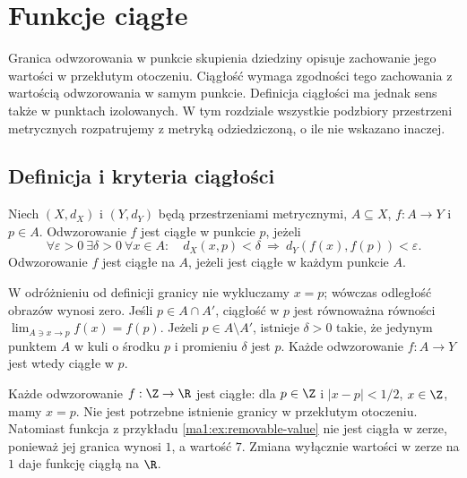 \chapter{Funkcje ciągłe}
\label{ma1:ch:continuous-functions}

Granica odwzorowania w punkcie skupienia dziedziny opisuje zachowanie jego wartości w przekłutym otoczeniu. Ciągłość wymaga zgodności tego zachowania z wartością odwzorowania w samym punkcie. Definicja ciągłości ma jednak sens także w punktach izolowanych. W tym rozdziale wszystkie podzbiory przestrzeni metrycznych rozpatrujemy z metryką odziedziczoną, o ile nie wskazano inaczej.

\section{Definicja i kryteria ciągłości}
\begin{definicja}
\label{ma1:def:continuity}
Niech $(X,d_X)$ i $(Y,d_Y)$ będą przestrzeniami metrycznymi, $A\subseteq X$, $f:A\to Y$ i $p\in A$. Odwzorowanie $f$ jest ciągłe w punkcie $p$, jeżeli
\[
 \forall\varepsilon>0\ \exists\delta>0\ \forall x\in A:
 \quad d_X(x,p)<\delta\ \Longrightarrow\ d_Y(f(x),f(p))<\varepsilon.
\]
Odwzorowanie $f$ jest ciągłe na $A$, jeżeli jest ciągłe w każdym punkcie $A$.
\end{definicja}
W odróżnieniu od definicji granicy nie wykluczamy $x=p$; wówczas odległość obrazów wynosi zero. Jeśli $p\in A\cap A'$, ciągłość w $p$ jest równoważna równości $\lim_{A\ni x\to p}f(x)=f(p)$. Jeżeli $p\in A\setminus A'$, istnieje $\delta>0$ takie, że jedynym punktem $A$ w kuli o środku $p$ i promieniu $\delta$ jest $p$. Każde odwzorowanie $f:A\to Y$ jest wtedy ciągłe w $p$.

\begin{przyklad}
\label{ma1:ex:isolated-continuity}
Każde odwzorowanie $f:\Z\to\R$ jest ciągłe: dla $p\in\Z$ i $|x-p|<1/2$, $x\in\Z$, mamy $x=p$. Nie jest potrzebne istnienie granicy w przekłutym otoczeniu.
Natomiast funkcja z przykładu \ref{ma1:ex:removable-value} nie jest ciągła w zerze, ponieważ jej granica wynosi $1$, a wartość $7$. Zmiana wyłącznie wartości w zerze na $1$ daje funkcję ciągłą na $\R$.
\end{przyklad}

